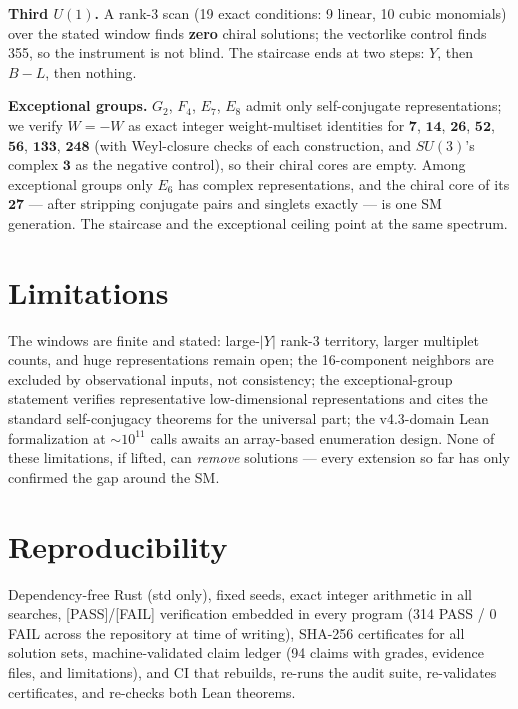 \documentclass[aps,prd,preprint,nofootinbib]{revtex4-2}
\begin{document}
\textbf{Third $U(1)$.} A rank-3 scan (19 exact conditions: 9 linear, 10 cubic
monomials) over the stated window finds \textbf{zero} chiral solutions; the
vectorlike control finds 355, so the instrument is not blind. The staircase
ends at two steps: $Y$, then $B-L$, then nothing.

\textbf{Exceptional groups.} $G_2$, $F_4$, $E_7$, $E_8$ admit only
self-conjugate representations; we verify $W=-W$ as exact integer
weight-multiset identities for $\mathbf{7}$, $\mathbf{14}$, $\mathbf{26}$,
$\mathbf{52}$, $\mathbf{56}$, $\mathbf{133}$, $\mathbf{248}$ (with Weyl-closure
checks of each construction, and $SU(3)$'s complex $\mathbf{3}$ as the negative
control), so their chiral cores are empty. Among exceptional groups only $E_6$
has complex representations, and the chiral core of its $\mathbf{27}$ --- after
stripping conjugate pairs and singlets exactly --- is one SM generation. The
staircase and the exceptional ceiling point at the same spectrum.

\section{Limitations}

The windows are finite and stated: large-$|Y|$ rank-3 territory, larger
multiplet counts, and huge representations remain open; the 16-component
neighbors are excluded by observational inputs, not consistency; the
exceptional-group statement verifies representative low-dimensional
representations and cites the standard self-conjugacy theorems for the
universal part; the v4.3-domain Lean formalization at $\sim 10^{11}$ calls
awaits an array-based enumeration design. None of these limitations, if lifted,
can \emph{remove} solutions --- every extension so far has only confirmed the
gap around the SM.

\section{Reproducibility}

Dependency-free Rust (std only), fixed seeds, exact integer arithmetic in all
searches, [PASS]/[FAIL] verification embedded in every program (314 PASS / 0
FAIL across the repository at time of writing), SHA-256 certificates for all
solution sets, machine-validated claim ledger (94 claims with grades, evidence
files, and limitations), and CI that rebuilds, re-runs the audit suite,
re-validates certificates, and re-checks both Lean theorems.
\end{document}
